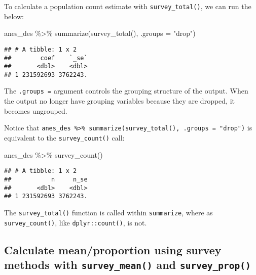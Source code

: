\documentclass[
]{krantz}
\makeatletter
\newenvironment{Shaded}{\begin{snugshade}}{\end{snugshade}}
\newcommand{\AttributeTok}[1]{\textcolor[rgb]{0.61,0.61,0.61}{#1}}
\newcommand{\FunctionTok}[1]{\textcolor[rgb]{0,0,0}{#1}}
\newcommand{\NormalTok}[1]{#1}
\newcommand{\SpecialCharTok}[1]{\textcolor[rgb]{0,0,0}{#1}}
\newcommand{\StringTok}[1]{\textcolor[rgb]{0.5,0.5,0.5}{#1}}
\newenvironment{kframe}{%
\medskip{}
\setlength{\fboxsep}{.8em}
 \def\at@end@of@kframe{}%
 \ifinner\ifhmode%
  \def\at@end@of@kframe{\end{minipage}}%
  \begin{minipage}{\columnwidth}%
 \fi\fi%
 \def\FrameCommand##1{\hskip\@totalleftmargin \hskip-\fboxsep
 \colorbox{shadecolor}{##1}\hskip-\fboxsep
     \hskip-\linewidth \hskip-\@totalleftmargin \hskip\columnwidth}%
 \MakeFramed {\advance\hsize-\width
   \@totalleftmargin\z@ \linewidth\hsize
   \@setminipage}}%
 {\par\unskip\endMakeFramed%
 \at@end@of@kframe}
\renewenvironment{Shaded}{\begin{kframe}}{\end{kframe}}
\makeatother
\begin{document}
To calculate a population count estimate with \texttt{survey\_total()}, we can run the below:

\begin{Shaded}
\begin{Highlighting}[]
\NormalTok{anes\_des }\SpecialCharTok{\%\textgreater{}\%}
  \FunctionTok{summarize}\NormalTok{(}\FunctionTok{survey\_total}\NormalTok{(), }\AttributeTok{.groups =} \StringTok{"drop"}\NormalTok{)}
\end{Highlighting}
\end{Shaded}

\begin{verbatim}
## # A tibble: 1 x 2
##        coef    `_se`
##       <dbl>    <dbl>
## 1 231592693 3762243.
\end{verbatim}

The \texttt{.groups\ =} argument controls the grouping structure of the output. When the output no longer have grouping variables because they are dropped, it becomes ungrouped.

Notice that \texttt{anes\_des\ \%\textgreater{}\%\ summarize(survey\_total(),\ .groups\ =\ "drop")} is equivalent to the \texttt{survey\_count()} call:

\begin{Shaded}
\begin{Highlighting}[]
\NormalTok{anes\_des }\SpecialCharTok{\%\textgreater{}\%}
  \FunctionTok{survey\_count}\NormalTok{() }
\end{Highlighting}
\end{Shaded}

\begin{verbatim}
## # A tibble: 1 x 2
##           n     n_se
##       <dbl>    <dbl>
## 1 231592693 3762243.
\end{verbatim}

The \texttt{survey\_total()} function is called within \texttt{summarize}, where as \texttt{survey\_count()}, like \texttt{dplyr::count()}, is not.

\hypertarget{calculate-meanproportion-using-survey-methods-with-survey_mean-and-survey_prop}{%
\subsection{\texorpdfstring{Calculate mean/proportion using survey methods with \texttt{survey\_mean()} and \texttt{survey\_prop()}}{Calculate mean/proportion using survey methods with survey\_mean() and survey\_prop()}}\label{calculate-meanproportion-using-survey-methods-with-survey_mean-and-survey_prop}}
\end{document}
